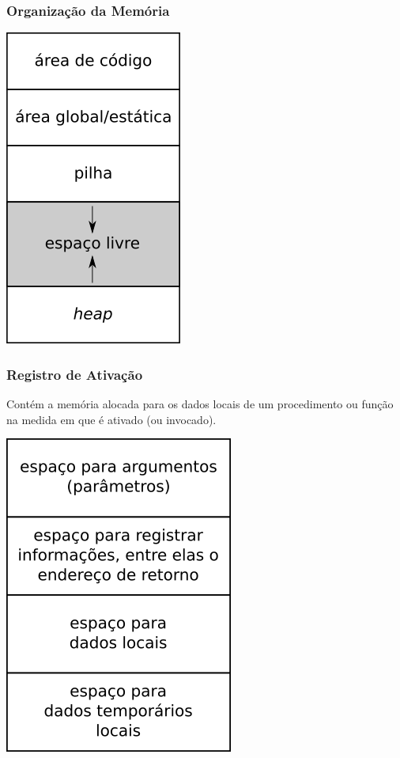 \documentclass[table]{beamer}
\begin{document}
\begin{frame}
   \frametitle{Organização da Memória}
   \begin{center}
   \includegraphics[scale=0.65]{figuras/heappilha.png}
   \end{center}
\end{frame}

\begin{frame}
   \frametitle{Registro de Ativação}
   Contém a memória alocada para os dados locais de um procedimento ou função na medida em que é ativado (ou invocado).
   \begin{center}
   \includegraphics[scale=0.5]{figuras/registroativacao.png}
   \end{center}
\end{frame}
\end{document}

